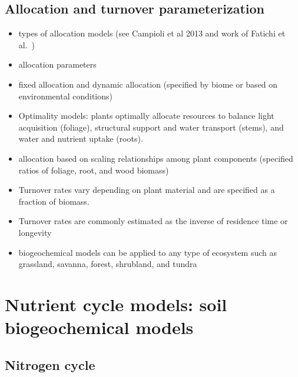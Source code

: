 \documentclass[
  oneside]{book}
\begin{document}
\hypertarget{allocation-and-turnover-parameterization}{%
\subsection{Allocation and turnover parameterization}\label{allocation-and-turnover-parameterization}}

\begin{itemize}
\item
  types of allocation models (see Campioli et al 2013 and work of Fatichi et al.~)
\item
  allocation parameters
\item
  fixed allocation and dynamic allocation (specified by biome or based on environmental conditions)
\item
  Optimality models: plants optimally allocate resources to balance light acquisition (foliage), structural support and water transport (stems), and water and nutrient uptake (roots).
\item
  allocation based on scaling relationships among plant components (specified ratios of foliage, root, and wood biomass)
\item
  Turnover rates vary depending on plant material and are specified as a fraction of biomass.
\item
  Turnover rates are commonly estimated as the inverse of residence time or longevity
\item
  biogeochemical models can be applied to any type of ecosystem such as grassland, savanna, forest, shrubland, and tundra
\end{itemize}

\hypertarget{nutrient-cycle-models-soil-biogeochemical-models}{%
\section{Nutrient cycle models: soil biogeochemical models}\label{nutrient-cycle-models-soil-biogeochemical-models}}

\hypertarget{nitrogen-cycle}{%
\subsection{Nitrogen cycle}\label{nitrogen-cycle}}
\end{document}
